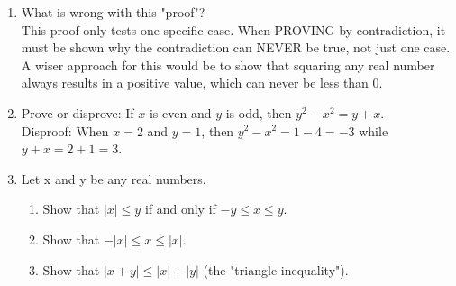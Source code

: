\documentclass{article}
\begin{document}
\begin{enumerate}
\item What is wrong with this "proof"? \\
    This proof only tests one specific case. When PROVING by contradiction, it must be shown why the contradiction can NEVER be true, not just one case. A wiser approach for this would be to show that squaring any real number always results in a positive value, which can never be less than 0. 
\item Prove or disprove: If $x$ is even and $y$ is odd, then $y^2-x^2=y+x$. \\
    Disproof: When $x=2$ and $y=1$, then $y^2-x^2=1-4=-3$ while $y+x=2+1=3$. \Lightning
\item Let x and y be any real numbers.
    \begin{enumerate}
        \item Show that $|x| \leq y$ if and only if $-y \leq x \leq y$.
        \item Show that $-|x| \leq x \leq |x|$.
        \item Show that $|x+y| \leq |x| + |y|$ (the "triangle inequality").
    \end{enumerate}
\end{enumerate}
\end{document}
